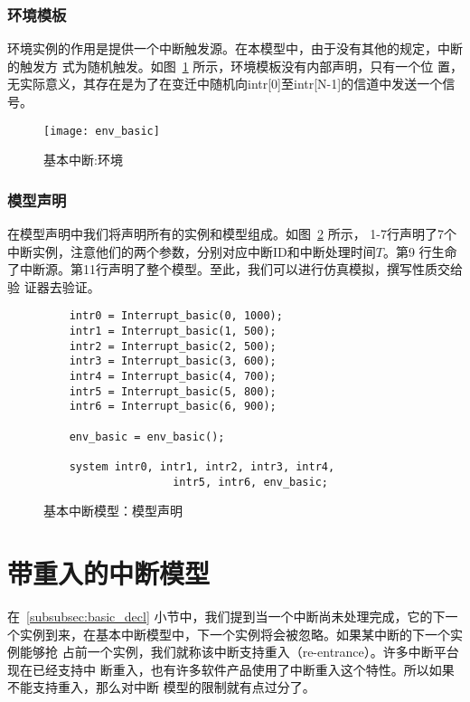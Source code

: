 \subsubsection{环境模板}
\label{subsubsec:basic_env}

环境实例的作用是提供一个中断触发源。在本模型中，由于没有其他的规定，中断的触发方
式为随机触发。如图~\ref{fig:evn_basic} 所示，环境模板没有内部声明，只有一个位
置，无实际意义，其存在是为了在变迁中随机向intr[0]至intr[N-1]的信道中发送一个信
号。

\begin{figure}[H]
	\centering
	\texttt{[image: env\_basic]}
	\caption{基本中断:环境}
	\label{fig:evn_basic}
\end{figure}

\subsubsection{模型声明}
\label{subsubsec:basic_model_decl}

在模型声明中我们将声明所有的实例和模型组成。如图~\ref{fig:basic_model_decl} 所示，
1-7行声明了7个中断实例，注意他们的两个参数，分别对应中断ID和中断处理时间$T$。第9
行生命了中断源。第11行声明了整个模型。至此，我们可以进行仿真模拟，撰写性质交给验
证器去验证。

\begin{figure}[H]
	\centering
	\begin{lstlisting}
	intr0 = Interrupt_basic(0, 1000);
	intr1 = Interrupt_basic(1, 500);
	intr2 = Interrupt_basic(2, 500);
	intr3 = Interrupt_basic(3, 600);
	intr4 = Interrupt_basic(4, 700);
	intr5 = Interrupt_basic(5, 800);
	intr6 = Interrupt_basic(6, 900);
	
	env_basic = env_basic();
	
	system intr0, intr1, intr2, intr3, intr4, 
					intr5, intr6, env_basic;
	\end{lstlisting}
	\caption{基本中断模型：模型声明}
	\label{fig:basic_model_decl}
\end{figure}

\section{带重入的中断模型}
\label{sec:reentrant}

在~\ref{subsubsec:basic_decl} 小节中，我们提到当一个中断尚未处理完成，它的下一
个实例到来，在基本中断模型中，下一个实例将会被忽略。如果某中断的下一个实例能够抢
占前一个实例，我们就称该中断支持重入（re-entrance）。许多中断平台现在已经支持中
断重入，也有许多软件产品使用了中断重入这个特性。所以如果不能支持重入，那么对中断
模型的限制就有点过分了。

